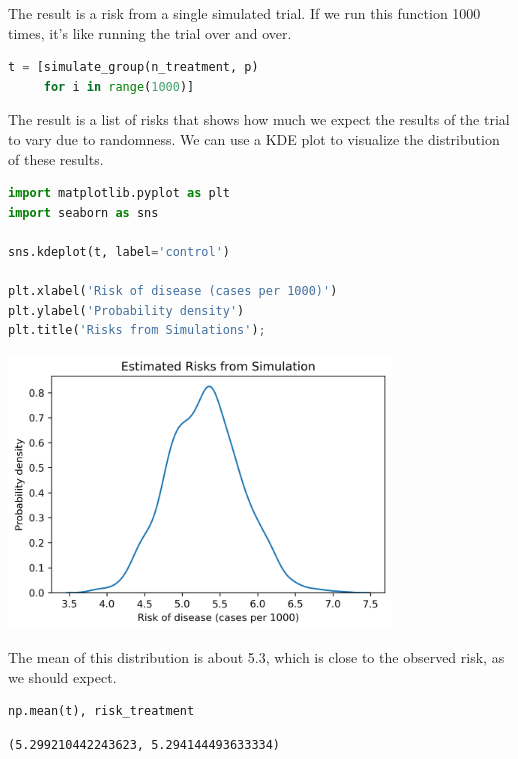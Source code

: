 The result is a risk from a single simulated trial. If we run this
function 1000 times, it's like running the trial over and over.

\begin{lstlisting}[language=Python,style=source]
t = [simulate_group(n_treatment, p)
     for i in range(1000)]
\end{lstlisting}

The result is a list of risks that shows how much we expect the results
of the trial to vary due to randomness. We can use a KDE plot to
visualize the distribution of these results.

\begin{lstlisting}[language=Python,style=source]
import matplotlib.pyplot as plt
import seaborn as sns

sns.kdeplot(t, label='control')

plt.xlabel('Risk of disease (cases per 1000)')
plt.ylabel('Probability density')
plt.title('Risks from Simulations');
\end{lstlisting}

\begin{center}
\includegraphics[width=4in]{chapters/11_resampling_files/11_resampling_30_0.png}
\end{center}

The mean of this distribution is about 5.3, which is close to the
observed risk, as we should expect.

\begin{lstlisting}[language=Python,style=source]
np.mean(t), risk_treatment
\end{lstlisting}

\begin{lstlisting}[style=output]
(5.299210442243623, 5.294144493633334)
\end{lstlisting}


